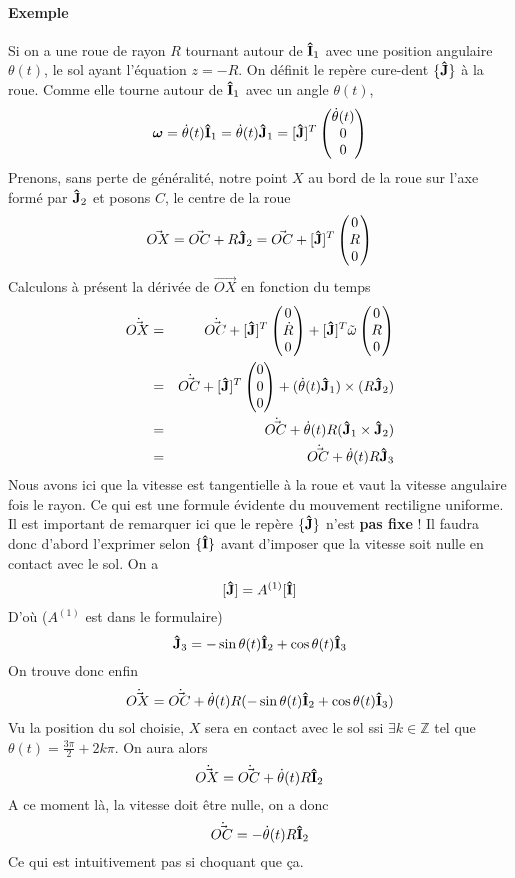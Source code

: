 \documentclass[11pt,a4paper]{article}
\newcommand\ui{{\bf\hat{I}}} %
\newcommand\uj{{\bf\hat{J}}} %
\newcommand\omegaf{{\bm \omega}}
\newcommand\omegat{\tilde{\omega}}
\newcommand\dvec[1]{\dot{\vec{ #1}}}
\begin{document}
\paragraph{Exemple}
Si on a une roue de rayon $R$ tournant autour de $\ui_1$ avec une position angulaire $\theta(t)$, le sol ayant l'équation $z = -R$.
On définit le repère cure-dent $\{\uj\}$ à la roue.
Comme elle tourne autour de $\ui_1$ avec un angle $\theta(t)$,
\[ \omegaf = \dot{\theta}(t) \ui_1 = \dot{\theta}(t) \uj_1 = [\uj]^T \begin{pmatrix}\dot{\theta}(t)\\0\\0\end{pmatrix} \]
Prenons, sans perte de généralité, notre point $X$ au bord de la roue sur l'axe formé par $\uj_2$ et posons $C$, le centre de la roue
\[ \vec{OX} = \vec{OC} + R \uj_2 = \vec{OC} + [\uj]^T \begin{pmatrix}0\\R\\0\end{pmatrix} \]
Calculons à présent la dérivée de $\vec{OX}$ en fonction du temps
\begin{eqnarray*}
	\dvec{OX} &=& \dvec{OC} + [\uj]^T \begin{pmatrix}0\\\dot{R}\\0\end{pmatrix} + [\uj]^T \omegat \begin{pmatrix}0\\R\\0\end{pmatrix}\\
	&=& \dvec{OC} + [\uj]^T \begin{pmatrix}0\\0\\0\end{pmatrix} + (\dot{\theta}(t) \uj_1) \times (R \uj_2)\\
	&=& \dvec{OC} + \dot{\theta}(t) R (\uj_1 \times \uj_2)\\
	&=& \dvec{OC} + \dot{\theta}(t) R \uj_3\\
\end{eqnarray*}
Nous avons ici que la vitesse est tangentielle à la roue et vaut la vitesse angulaire fois le rayon.
Ce qui est une formule évidente du mouvement rectiligne uniforme.
Il est important de remarquer ici que le repère $\{\uj\}$ n'est {\bf pas fixe} !
Il faudra donc d'abord l'exprimer selon $\{\ui\}$ avant d'imposer que la vitesse soit nulle en contact avec le sol.
On a
\[ [\uj] = A^{(1)} [\ui] \]
D'où ($A^{(1)}$ est dans le formulaire)
\[ \uj_3 = -\sin\theta(t) \ui_2 + \cos\theta(t) \ui_3 \]
On trouve donc enfin
\[ \dvec{OX} = \dvec{OC} + \dot{\theta}(t) R (-\sin\theta(t) \ui_2 + \cos\theta(t) \ui_3) \]
Vu la position du sol choisie, $X$ sera en contact avec le sol ssi $\exists k \in \mathbb{Z}$ tel que $\theta(t) = \frac{3\pi}{2} + 2k\pi$.
On aura alors
\[ \dvec{OX} = \dvec{OC} + \dot{\theta}(t) R \ui_2 \]
A ce moment là, la vitesse doit être nulle, on a donc
\[ \dvec{OC} = -\dot{\theta}(t) R \ui_2 \]
Ce qui est intuitivement pas si choquant que ça.
\end{document}
